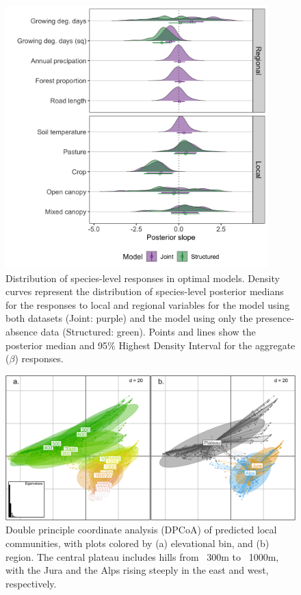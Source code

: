 \documentclass[preprint,review,times,12pt]{elsarticle}
\begin{document}
\begin{figure}
\centering\includegraphics[width=4in]{figs/slope_means.png}
\caption{\label{fig:slope_means} Distribution of species-level responses in optimal models. Density curves represent the distribution of species-level posterior medians for the responses to local and regional variables for the model using both datasets (Joint: purple) and the model using only the presence-absence data (Structured: green). Points and lines show the posterior median and 95\% Highest Density Interval for the aggregate ($\beta$) responses. }
\end{figure}

\begin{figure}
	\centering\includegraphics[width=5in]{figs/DPCoA.png}
	\caption{\label{fig:dpcoa} Double principle coordinate analysis (DPCoA) of predicted local communities, with plots colored by (a) elevational bin, and (b) region. The central plateau includes hills from ~300m to ~1000m, with the Jura and the Alps rising steeply in the east and west, respectively. }
\end{figure}
\end{document}
